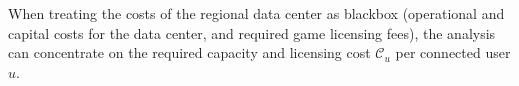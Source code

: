 When treating the costs of the regional data center as blackbox (operational and capital costs for the data center, and required game licensing fees), the analysis can concentrate on the required capacity and licensing cost $\mathcal{C}_{u}$ per connected user $u$.








